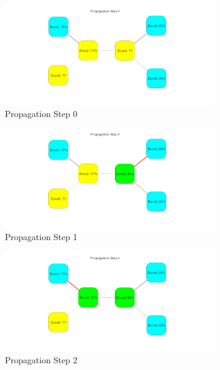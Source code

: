 \documentclass{article}
\begin{document}
\begin{large}
\begin{enumerate}
\begin{figure}
\begin{subfigure}[b]{.5\linewidth}
\includegraphics[width=\linewidth]{semi_supervised_graph_scene1.png}
\caption{Propagation Step 0}
\end{subfigure}
\begin{subfigure}[b]{.5\linewidth}
\includegraphics[width=\linewidth]{semi_supervised_graph_scene2.png}
\caption{Propagation Step 1}
\end{subfigure}
\begin{subfigure}[b]{.5\linewidth}
\includegraphics[width=\linewidth]{semi_supervised_graph_scene3.png}
\caption{Propagation Step 2}
\end{subfigure}
\begin{subfigure}[b]{.5\linewidth}

\end{subfigure}
\end{figure}
\end{enumerate}
\end{large}
\end{document}
